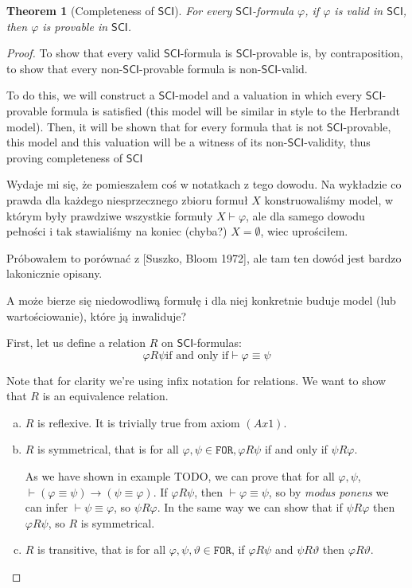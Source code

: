 \documentclass{article}
\newtheorem{theorem}{Theorem}
\theoremstyle{definition}
\theoremstyle{definition}
\newcommand*{\id}{\equiv}
\newcommand*{\ra}{\rightarrow}
\newcommand*{\FOR}{\texttt{FOR}}
\newcommand{\SCI}{$\mathsf{SCI}$\xspace}
\begin{document}
\begin{theorem}[Completeness of \SCI]
    For every \SCI-formula $\varphi$, if $\varphi$ is valid in \SCI, then $\varphi$ is provable in \SCI.
\end{theorem}
\begin{proof}
    To show that every valid \SCI-formula is \SCI-provable is, by contraposition, to show that every non-\SCI-provable formula is non-\SCI-valid.

    To do this, we will construct a \SCI-model and a valuation in which every
    \SCI-provable formula is satisfied (this model will be similar in style to the
    Herbrandt model). Then, it will be shown that for every formula that is not
    \SCI-provable, this model and this valuation will be a witness of its
    non-\SCI-validity, thus proving completeness of \SCI

    {\color{red}Wydaje mi się, że pomieszałem coś w notatkach z tego dowodu. Na wykładzie co prawda dla każdego niesprzecznego zbioru formuł $X$ konstruowaliśmy model, w którym były prawdziwe wszystkie formuły $X \vdash \varphi$, ale dla samego dowodu pełności i tak stawialiśmy na koniec (chyba?) $X = \emptyset$, wiec uprościłem.

        Próbowałem to porównać z [Suszko, Bloom 1972], ale tam ten dowód jest bardzo
        lakonicznie opisany.

        A może bierze się niedowodliwą formułę i dla niej konkretnie buduje model (lub
        wartościowanie), które ją inwaliduje?}

    First, let us define a relation $R$ on \SCI-formulas: $$ \varphi R \psi \text{
            if and only if} \vdash \varphi \id \psi $$

    Note that for clarity we're using infix notation for relations. We want to show
    that $R$ is an equivalence relation.
    \begin{enumerate}[(a)]
        \item $R$ is reflexive. It is trivially true from axiom $(Ax1)$.
        \item $R$ is symmetrical, that is for all $\varphi, \psi \in \FOR, \varphi R \psi$ if and only if $\psi R \varphi$.

              As we have shown in example TODO, we can prove that for all $\varphi, \psi$,
              $\vdash (\varphi \id \psi) \ra (\psi \id \varphi)$. If $\varphi R \psi$, then
              $\vdash \varphi \id \psi$, so by \emph{modus ponens} we can infer $\vdash \psi
                  \id \varphi$, so $\psi R \varphi$. In the same way we can show that if $\psi R
                  \varphi$ then $\varphi R \psi$, so $R$ is symmetrical.
        \item $R$ is transitive, that is for all $\varphi, \psi, \vartheta \in \FOR$, if $\varphi R \psi$ and $\psi R \vartheta$ then $\varphi R \vartheta$.


\end{enumerate}
\end{proof}
\end{document}
